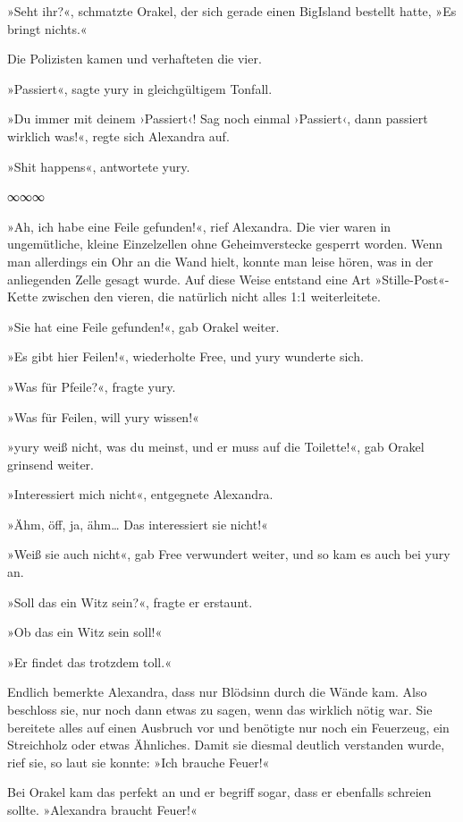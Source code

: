 »Seht ihr?«, schmatzte Orakel, der sich gerade einen BigIsland bestellt hatte, »Es bringt nichts.«

Die Polizisten kamen und verhafteten die vier.

»Passiert«, sagte yury in gleichgültigem Tonfall.

»Du immer mit deinem ›Passiert‹! Sag noch einmal ›Passiert‹, dann passiert wirklich was!«, regte sich Alexandra auf.

»Shit happens«, antwortete yury.

\begin{center}
    ∞∞∞
\end{center}

»Ah, ich habe eine Feile gefunden!«, rief Alexandra. Die vier waren in ungemütliche, kleine Einzelzellen ohne Geheimverstecke gesperrt worden. Wenn man allerdings ein Ohr an die Wand hielt, konnte man leise hören, was in der anliegenden Zelle gesagt wurde. Auf diese Weise entstand eine Art »Stille-Post«-Kette zwischen den vieren, die natürlich nicht alles 1:1 weiterleitete.

»Sie hat eine Feile gefunden!«, gab Orakel weiter.

»Es gibt hier Feilen!«, wiederholte Free, und yury wunderte sich.

»Was für Pfeile?«, fragte yury.

»Was für Feilen, will yury wissen!«

»yury weiß nicht, was du meinst, und er muss auf die Toilette!«, gab Orakel grinsend weiter.

»Interessiert mich nicht«, entgegnete Alexandra.

»Ähm, öff, ja, ähm… Das interessiert sie nicht!«

»Weiß sie auch nicht«, gab Free verwundert weiter, und so kam es auch bei yury an.

»Soll das ein Witz sein?«, fragte er erstaunt.

»Ob das ein Witz sein soll!«

»Er findet das trotzdem toll.«

Endlich bemerkte Alexandra, dass nur Blödsinn durch die Wände kam. Also beschloss sie, nur noch dann etwas zu sagen, wenn das wirklich nötig war. Sie bereitete alles auf einen Ausbruch vor und benötigte nur noch ein Feuerzeug, ein Streichholz oder etwas Ähnliches. Damit sie diesmal deutlich verstanden wurde, rief sie, so laut sie konnte: »Ich brauche Feuer!«

Bei Orakel kam das perfekt an und er begriff sogar, dass er ebenfalls schreien sollte. »Alexandra braucht Feuer!«

